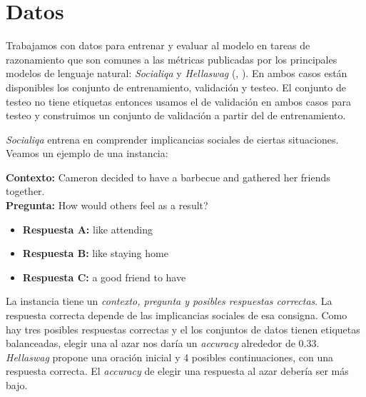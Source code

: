 \documentclass[11pt,a4paper,twoside]{tesis}
\begin{document}
\section{Datos}
Trabajamos con datos para entrenar y evaluar al modelo en tareas de razonamiento que son comunes a las métricas publicadas por los principales modelos de lenguaje natural: \textit{Socialiqa} y \textit{Hellaswag} (\cite{sap2019socialiqa}, \cite{zellers2019hellaswag}  ). En ambos casos están disponibles los conjunto de entrenamiento, validación y testeo. El conjunto de testeo no tiene etiquetas entonces usamos el de validación en ambos casos para testeo y construimos un conjunto de validación a partir del de entrenamiento. 

\textit{Socialiqa} entrena en comprender implicancias sociales de ciertas situaciones. Veamos un ejemplo de una instancia:


\begin{mdframed}
\small %
\textbf{Contexto:} Cameron decided to have a barbecue and gathered her friends together.\\
\textbf{Pregunta:} How would others feel as a result?
\begin{itemize}
    \item \textbf{Respuesta A:} like attending
    \item \textbf{Respuesta B:} like staying home
    \item \textbf{Respuesta C:} a good friend to have
\end{itemize}
\end{mdframed}

La instancia tiene un \textit{contexto, pregunta y posibles respuestas correctas}. La respuesta correcta depende de las implicancias sociales de esa consigna. Como hay tres posibles respuestas correctas y el los conjuntos de datos tienen etiquetas balanceadas, elegir una al azar nos daría un \textit{accuracy} alrededor de 0.33. 
\textit{Hellaswag} propone una oración inicial y 4 posibles continuaciones, con una respuesta correcta. El \textit{accuracy} de elegir una respuesta al azar debería ser más bajo.
\end{document}
